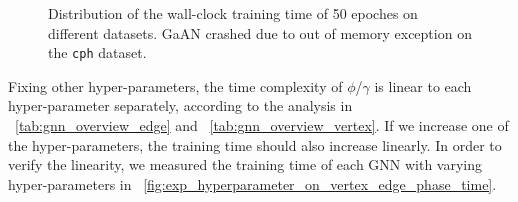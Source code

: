 \begin{figure}
    \caption{Distribution of the wall-clock training time of 50 epoches on different datasets. GaAN crashed due to out of memory exception on the \texttt{cph} dataset.}
	\label{fig:exp_absolute_training_time}
\end{figure}

Fixing other hyper-parameters, the time complexity of $\phi$/$\gamma$ is linear to each hyper-parameter separately, according to the analysis in \tablename~\ref{tab:gnn_overview_edge} and \tablename~\ref{tab:gnn_overview_vertex}.
If we increase one of the hyper-parameters, the training time should also increase linearly.
In order to verify the linearity, we measured the training time of each GNN with varying hyper-parameters in \figurename~\ref{fig:exp_hyperparameter_on_vertex_edge_phase_time}.

